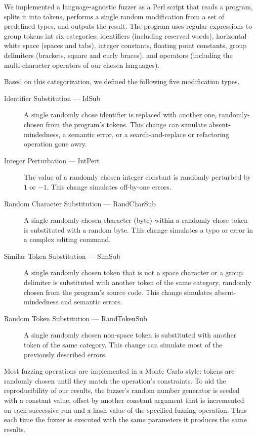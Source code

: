 \documentclass[10pt]{sigplanconf}
\begin{document}
We implemented a language-agnostic fuzzer as a Perl script
that reads a program,
splits it into tokens,
performs a single random modification from a set of
predefined types,
and outputs the result.
The program uses regular expressions to group tokens int
six categories:
identifiers (including reserved words),
horizontal white space (spaces and tabs),
integer constants,
floating point constants,
group delimiters (brackets, square and curly braces), and
operators (including the multi-character operators of our chosen languages).

Based on this categorization,
we defined the following five modification types.
\begin{description}
\item [Identifier Substitution --- IdSub]
A single randomly chose identifier is replaced with another one,
randomly-chosen from the program's tokens.
This change can simulate absent-mindedness, a semantic error, or
a search-and-replace or refactoring operation gone awry.
\item [Integer Perturbation --- IntPert]
The value of a randomly chosen integer constant
is randomly perturbed by $1$ or $-1$.
This change simulates off-by-one errors.
\item [Random Character Substitution --- RandCharSub]
A single randomly chosen character (byte) within a randomly chose token
is substituted with a random byte.
This change simulates a typo or error in a complex editing command.
\item [Similar Token Substitution --- SimSub]
A single randomly chosen token
that is not a space character or a group delimiter
is substituted with another token of the same category,
randomly chosen from the program's source code.
This change simulates absent-mindedness and semantic errors.
\item [Random Token Substitution --- RandTokenSub]
A single randomly chosen non-space token
is substituted with another token of the same category,
This change can simulate most of the previously described errors.
\end{description}

Most fuzzing operations are implemented in a Monte Carlo style:
tokens are randomly chosen until they match the operation's constraints.
To aid the reproducibility of our results,
the fuzzer's random number generator is seeded with a constant value,
offset by another constant argument that is incremented on each successive run
and a hash value of the specified fuzzing operation.
Thus each time the fuzzer is executed with the same parameters it
produces the same results.
\end{document}
